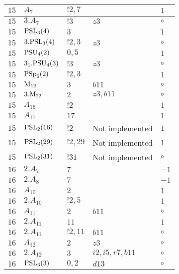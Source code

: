 \documentclass[a4paper, 11pt]{article}
\begin{document}
\begin{longtable}{lllll}
        $ 15 $ & $ A_{7} $ & $ ! 2,7 $ & $ ~ $ & $ 1$ \\ \hline
        $ 15 $ & $ 3.A_{7} $ & $ ! 3 $ & $ z3 $ &  $\circ$ \\ \hline
        $ 15 $ & $ {\rm PSL}_{3}(4) $ & $ 3 $ & $ ~ $ & $ 1$ \\ \hline
        $ 15 $ & $ 3.{\rm PSL}_{3}(4) $ & $ ! 2,3 $ & $ z3 $ &  $\circ$ \\ \hline
        $ 15 $ & $ {\rm PSU}_{4}(2) $ & $ 0,5 $ & $ ~ $ & $ 1$ \\ \hline
        $ 15 $ & $ 3_1.{\rm PSU}_{4}(3) $ & $ ! 3 $ & $ z3 $ &  $\circ$ \\ \hline
        $ 15 $ & $ {\rm PSp}_{6}(2) $ & $ ! 2,3 $ & $ ~ $ & $ 1$ \\ \hline
        $ 15 $ & $ {\rm M}_{12} $ & $ 3 $ & $ b11 $ &  $\circ$ \\ \hline
        $ 15 $ & $ 3.{\rm M}_{22} $ & $ 2 $ & $ z3, b11 $ &  $\circ$ \\ \hline
        $ 15 $ & $ A_{16} $ & $ !2 $ & $ ~ $ & $ 1$ \\ \hline
        $ 15 $ & $ A_{17} $ & $ 17 $ & $ ~ $ & $ 1$ \\ \hline
        $ 15 $ & $ {\rm PSL}_{2}(16) $ & $ !2 $ &  Not implemented & $ 1$ \\ \hline
        $ 15 $ & $ {\rm PSL}_{2}(29) $ & $ !2, 29 $ &  Not implemented & $ 1$ \\ \hline
        $ 15 $ & $ {\rm PSL}_{2}(31) $ & $ !31 $ &  Not implemented &  $\circ$ \\ \hline
        $ 16 $ & $ 2.A_{7} $ & $ 7 $ & $ ~ $ & $ -1$ \\ \hline
        $ 16 $ & $ 2.A_{8} $ & $ 7 $ & $ ~ $ & $ -1$ \\ \hline
        $ 16 $ & $ A_{10} $ & $ 2 $ & $ ~ $ & $ 1$ \\ \hline
        $ 16 $ & $ 2.A_{10} $ & $ ! 2,5 $ & $ ~ $ & $ 1$ \\ \hline
        $ 16 $ & $ A_{11} $ & $ 2 $ & $ b11 $ &  $\circ$ \\ \hline
        $ 16 $ & $ 2.A_{11} $ & $ 11 $ & $ ~ $ & $ 1$ \\ \hline
        $ 16 $ & $ 2.A_{11} $ & $ ! 2,11 $ & $ b11 $ &  $\circ$ \\ \hline
        $ 16 $ & $ A_{12} $ & $ 2 $ & $ z3 $ &  $\circ$ \\ \hline
        $ 16 $ & $ 2.A_{12} $ & $ 3 $ & $ i2, i5, r7, b11 $ &  $\circ$ \\ \hline
        $ 16 $ & $ {\rm PSL}_{3}(3) $ & $ 0,2 $ & $ d13 $ &  $\circ$ \\ \hline

\end{longtable}
\end{document}
